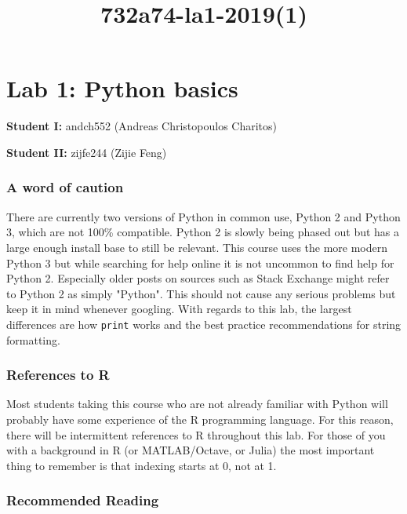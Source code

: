 \documentclass[11pt]{article}
\title{732a74-la1-2019(1)}
\begin{document}
    
    
    \maketitle
    
    

    
    \section{Lab 1: Python basics}\label{lab-1-python-basics}

    \textbf{Student I:} andch552 (Andreas Christopoulos Charitos)

\textbf{Student II:} zijfe244 (Zijie Feng)

    \subsubsection{A word of caution}\label{a-word-of-caution}

There are currently two versions of Python in common use, Python 2 and
Python 3, which are not 100\% compatible. Python 2 is slowly being
phased out but has a large enough install base to still be relevant.
This course uses the more modern Python 3 but while searching for help
online it is not uncommon to find help for Python 2. Especially older
posts on sources such as Stack Exchange might refer to Python 2 as
simply "Python". This should not cause any serious problems but keep it
in mind whenever googling. With regards to this lab, the largest
differences are how \texttt{print} works and the best practice
recommendations for string formatting.

    \subsubsection{References to R}\label{references-to-r}

Most students taking this course who are not already familiar with
Python will probably have some experience of the R programming language.
For this reason, there will be intermittent references to R throughout
this lab. For those of you with a background in R (or MATLAB/Octave, or
Julia) the most important thing to remember is that indexing starts at
0, not at 1.

    \subsubsection{Recommended Reading}\label{recommended-reading}
\end{document}
